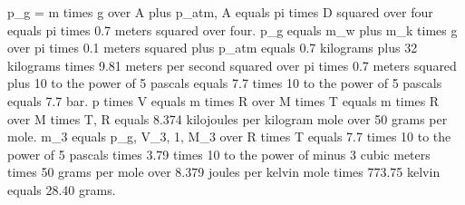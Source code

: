 p_g = m times g over A plus p_atm, A equals pi times D squared over four equals pi times 0.7 meters squared over four. p_g equals m_w plus m_k times g over pi times 0.1 meters squared plus p_atm equals 0.7 kilograms plus 32 kilograms times 9.81 meters per second squared over pi times 0.7 meters squared plus 10 to the power of 5 pascals equals 7.7 times 10 to the power of 5 pascals equals 7.7 bar. p times V equals m times R over M times T equals m times R over M times T, R equals 8.374 kilojoules per kilogram mole over 50 grams per mole. m_3 equals p_g, V_3, 1, M_3 over R times T equals 7.7 times 10 to the power of 5 pascals times 3.79 times 10 to the power of minus 3 cubic meters times 50 grams per mole over 8.379 joules per kelvin mole times 773.75 kelvin equals 28.40 grams.